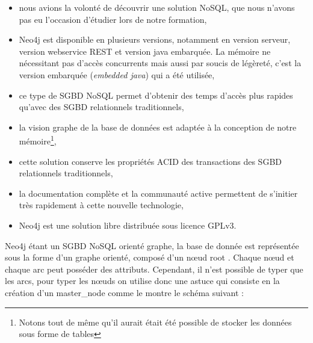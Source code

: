 \begin{itemize}
\item nous avions la volonté de découvrir une solution \gls{NoSQL}, que nous n'avons pas eu l'occasion d'étudier lors de notre formation,

\item Neo4j est disponible en plusieurs versions, notamment en version serveur, version webservice REST et version java embarquée. La mémoire ne nécessitant pas d'accès concurrents mais aussi par soucis de légèreté, c'est la version embarquée (\emph{embedded java}) qui a été utilisée,

\item ce type de \gls{SGBD} \gls{NoSQL} permet d'obtenir des temps d'accès plus rapides qu'avec des \gls{SGBD} relationnels traditionnels,

\item la vision graphe de la base de données est adaptée à la conception de notre mémoire\footnote{Notons tout de même qu'il aurait était été possible de stocker les données sous forme de tables},

\item cette solution conserve les propriétés \gls{ACID} des transactions des \gls{SGBD} relationnels traditionnels,

\item la documentation complète et la communauté active permettent de s'initier très rapidement à cette nouvelle technologie,

\item Neo4j est une solution libre distribuée sous licence \gls{GPLv3}.
\end{itemize}

Neo4j étant un \gls{SGBD} \gls{NoSQL} orienté graphe, la base de donnée est représentée sous la forme d'un graphe orienté, composé d'un nœud \og root \fg{}. Chaque nœud et chaque arc peut posséder des attributs. Cependant, il n'est possible de typer que les arcs, pour typer les nœuds on utilise donc une astuce qui consiste en la création d'un \og master\_node \fg{} comme le montre le schéma suivant : 

